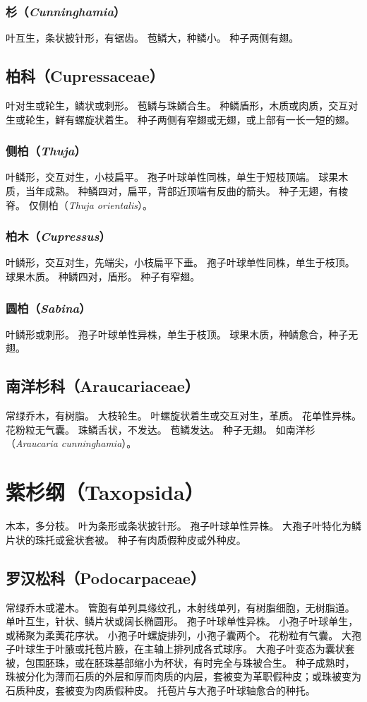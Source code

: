 \documentclass[11pt]{article}
\begin{document}
\begin{sloppypar}
\subsubsection{杉（\textit{Cunninghamia}）}
叶互生，条状披针形，有锯齿。
苞鳞大，种鳞小。
种子两侧有翅。

\subsection{柏科（Cupressaceae）}
叶对生或轮生，鳞状或刺形。
苞鳞与珠鳞合生。
种鳞盾形，木质或肉质，交互对生或轮生，鲜有螺旋状着生。
种子两侧有窄翅或无翅，或上部有一长一短的翅。

\subsubsection{侧柏（\textit{Thuja}）}
叶鳞形，交互对生，小枝扁平。
孢子叶球单性同株，单生于短枝顶端。
球果木质，当年成熟。
种鳞四对，扁平，背部近顶端有反曲的箭头。
种子无翅，有棱脊。
仅侧柏（\textit{Thuja orientalis}）。

\subsubsection{柏木（\textit{Cupressus}）}
叶鳞形，交互对生，先端尖，小枝扁平下垂。
孢子叶球单性同株，单生于枝顶。
球果木质。
种鳞四对，盾形。
种子有窄翅。

\subsubsection{圆柏（\textit{Sabina}）}
叶鳞形或刺形。
孢子叶球单性异株，单生于枝顶。
球果木质，种鳞愈合，种子无翅。

\subsection{南洋杉科（Araucariaceae）}
常绿乔木，有树脂。
大枝轮生。
叶螺旋状着生或交互对生，革质。
花单性异株。
花粉粒无气囊。
珠鳞舌状，不发达。
苞鳞发达。
种子无翅。
如南洋杉（\textit{Araucaria cunninghamia}）。

\section{紫杉纲（Taxopsida）}
木本，多分枝。
叶为条形或条状披针形。
孢子叶球单性异株。
大孢子叶特化为鳞片状的珠托或瓮状套被。
种子有肉质假种皮或外种皮。

\subsection{罗汉松科（Podocarpaceae）}
常绿乔木或灌木。
管胞有单列具缘纹孔，木射线单列，有树脂细胞，无树脂道。
单叶互生，针状、鳞片状或阔长椭圆形。
孢子叶球单性异株。
小孢子叶球单生，或稀聚为柔荑花序状。
小孢子叶螺旋排列，小孢子囊两个。
花粉粒有气囊。
大孢子叶球生于叶腋或托苞片腋，在主轴上排列成各式球序。
大孢子叶变态为囊状套被，包围胚珠，或在胚珠基部缩小为杯状，有时完全与珠被合生。
种子成熟时，珠被分化为薄而石质的外层和厚而肉质的内层，套被变为革职假种皮；或珠被变为石质种皮，套被变为肉质假种皮。
托苞片与大孢子叶球轴愈合的种托。


\end{sloppypar}
\end{document}
